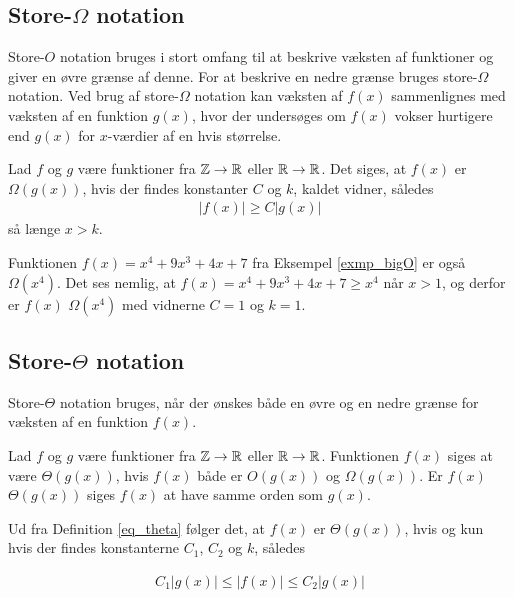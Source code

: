 \subsection{Store-$\Omega$ notation}
Store-$O$ notation bruges i stort omfang til at beskrive væksten af funktioner og giver en øvre grænse af denne. 
For at beskrive en nedre grænse bruges store-$\Omega$ notation.
Ved brug af store-$\Omega$ notation kan væksten af $f(x)$ sammenlignes med væksten af en funktion $g(x)$, hvor der undersøges om $f(x)$ vokser hurtigere end $g(x)$ for $x$-værdier af en hvis størrelse.

\begin{defn}
	Lad $f$ og $g$ være funktioner fra $\mathbb{Z} \to \mathbb{R}$ eller $\mathbb{R} \to \mathbb{R}$. 
	Det siges, at $f(x)$ er $\Omega(g(x))$, hvis der findes konstanter $C$ og $k$, kaldet vidner, således 
	\begin{align*}
		|f(x)| \geq C |g(x)|
	\end{align*}
så længe $x>k$.
\end{defn}

\begin{exmp}\label{exmp_theta}
Funktionen $f(x)=x^4+9x^3+4x+7$ fra Eksempel \ref{exmp_bigO} er også $\Omega(x^4)$. 
Det ses nemlig, at $f(x)=x^4+9x^3+4x+7 \geq x^4 $ når $x>1$, og derfor er $f(x)$ $\Omega(x^4)$ med vidnerne $C=1$ og $k=1$.
\end{exmp}

\subsection{Store-$\Theta$ notation}
Store-$\Theta$ notation bruges, når der ønskes både en øvre og en nedre grænse for væksten af en funktion $f(x)$. \\

\begin{defn}\label{eq_theta}
	Lad $f$ og $g$ være funktioner fra $\mathbb{Z} \to \mathbb{R}$ eller $\mathbb{R} \to \mathbb{R}$. 
Funktionen $f(x)$ siges at være $\Theta (g(x))$, hvis $f(x)$ både er $O(g(x))$ og $\Omega (g(x))$. 
	Er $f(x)$ $\Theta (g(x))$ siges $f(x)$ at have samme orden som $g(x)$. 
\end{defn}

Ud fra Definition \ref{eq_theta} følger det, at $f(x)$ er $\Theta (g(x))$, hvis og kun hvis der findes konstanterne $C_1$, $C_2$ og $k$, således

\begin{align*}
	C_1 |g(x)| \leq |f(x)| \leq C_2 |g(x)|
\end{align*}

